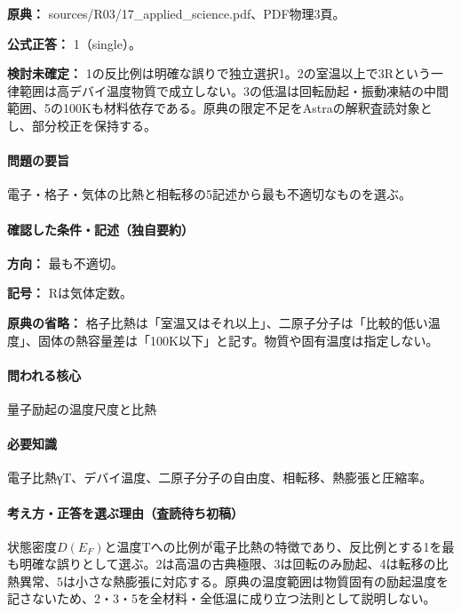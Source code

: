 \noindent\textbf{原典：} sources/R03/17\_applied\_science.pdf、PDF物理3頁。

\textbf{公式正答：} 1（single）。

\par\textbf{検討未確定：} 1の反比例は明確な誤りで独立選択1。2の室温以上で3Rという一律範囲は高デバイ温度物質で成立しない。3の低温は回転励起・振動凍結の中間範囲、5の100Kも材料依存である。原典の限定不足をAstraの解釈査読対象とし、部分校正を保持する。

\paragraph{問題の要旨} 電子・格子・気体の比熱と相転移の5記述から最も不適切なものを選ぶ。

\paragraph{確認した条件・記述（独自要約）}\mbox{}\par

\noindent\textbf{方向：} 最も不適切。\par

\noindent\textbf{記号：} Rは気体定数。\par

\noindent\textbf{原典の省略：} 格子比熱は「室温又はそれ以上」、二原子分子は「比較的低い温度」、固体の熱容量差は「100K以下」と記す。物質や固有温度は指定しない。\par

\paragraph{問われる核心} 量子励起の温度尺度と比熱

\paragraph{必要知識} 電子比熱γT、デバイ温度、二原子分子の自由度、相転移、熱膨張と圧縮率。

\paragraph{考え方・正答を選ぶ理由（査読待ち初稿）} 状態密度\(D(E_F)\)と温度Tへの比例が電子比熱の特徴であり、反比例とする1を最も明確な誤りとして選ぶ。2は高温の古典極限、3は回転のみ励起、4は転移の比熱異常、5は小さな熱膨張に対応する。原典の温度範囲は物質固有の励起温度を記さないため、2・3・5を全材料・全低温に成り立つ法則として説明しない。

